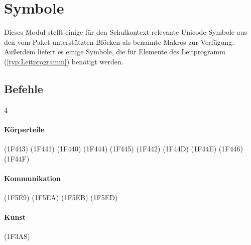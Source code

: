 \section{Symbole}
\label{modul:symbole}
Dieses Modul stellt einige für den Schulkontext relevante Unicode-Symbole aus den vom Paket  unterstützten Blöcken als benannte Makros zur Verfügung. Außerdem liefert es einige Symbole, die für Elemente des Leitprogramm (\autoref{typ:Leitprogramm}) benötigt werden.

\subsection{Befehle}
\begin{multicols}{4}

\paragraph{Körperteile}
\begin{commands}
		{\Huge{}} (1F443)
		{\Huge{}} (1F441)
		{\Huge{}} (1F440)
		{\Huge{}} (1F444)
		{\Huge{}} (1F445)
		{\Huge{}} (1F442)
		{\Huge{}} (1F44D)
		{\Huge{}} (1F44E)
		{\Huge{}} (1F446)
		{\Huge{}} (1F44F)
	
\end{commands}

\paragraph{Kommunikation}
\begin{commands}
		{\Huge{}} (1F5E9)
		{\Huge{}} (1F5EA)
		{\Huge{}} (1F5EB)
		{\Huge{}} (1F5ED)
	
\end{commands}

\paragraph{Kunst}
\begin{commands}
		{\Huge{}} (1F3A8)
	

\end{commands}
\end{multicols}
